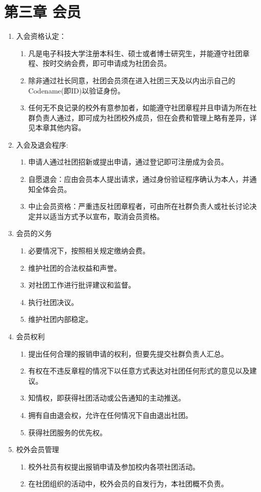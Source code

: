 \documentclass[a4paper]{article}
\newcommand\liststyleWWNumiv{%
\renewcommand\theenumi{\arabic{enumi}}
\renewcommand\theenumii{\arabic{enumi}.\arabic{enumii}}
\renewcommand\theenumiii{\arabic{enumi}.\arabic{enumii}.\arabic{enumiii}}
\renewcommand\theenumiv{\arabic{enumi}.\arabic{enumii}.\arabic{enumiii}.\arabic{enumiv}}
\renewcommand\labelenumi{\theenumi.}
\renewcommand\labelenumii{\theenumii.}
\renewcommand\labelenumiii{\theenumiii.}
\renewcommand\labelenumiv{\theenumiv.}
}
\begin{document}
\section[第三章 会员]{第三章 会员}
\liststyleWWNumiv
\begin{enumerate}
\item 入会资格认定：

\begin{enumerate}
\item 凡是电子科技大学注册本科生、硕士或者博士研究生，并能遵守社团章程、按时交纳会费，即可申请成为社团会员。
\item 除非通过社长同意，社团会员须在进入社团三天及以内出示自己的Codename(即ID)以验证身份。
\item 任何无不良记录的校外有意参加者，如能遵守社团章程并且申请为所在社群负责人通过，即可成为社团校外成员，但在会费和管理上略有差异，详见本章其他内容。
\end{enumerate}
\item 入会及退会程序:

\begin{enumerate}
\item 申请人通过社团招新或提出申请，通过登记即可注册成为会员。
\item 自愿退会：应由会员本人提出请求，通过身份验证程序确认为本人，并通知全体会员。
\item 中止会员资格：严重违反社团章程者，可由所在社群负责人或社长讨论决定并以适当方式予以宣布，取消会员资格。
\end{enumerate}
\item 会员的义务

\begin{enumerate}
\item 必要情况下，按照相关规定缴纳会费。
\item 维护社团的合法权益和声誉。
\item 对社团工作进行批评建议和监督。
\item 执行社团决议。
\item 维护社团内部稳定。
\end{enumerate}
\item 会员权利

\begin{enumerate}
\item 提出任何合理的报销申请的权利，但要先提交社群负责人汇总。
\item 有权在不违反章程的情况下以任意方式表达对社团任何形式的意见以及建议。
\item 知情权，即获得社团活动或公告通知的主动推送。
\item 拥有自由退会权，允许在任何情况下自由退出社团。
\item 获得社团服务的优先权。
\end{enumerate}
\item 校外会员管理

\begin{enumerate}
\item 校外社员有权提出报销申请及参加校内各项社团活动。
\item 在社团组织的活动中，校外会员的自发行为，本社团概不负责。
\end{enumerate}
\end{enumerate}
\end{document}
